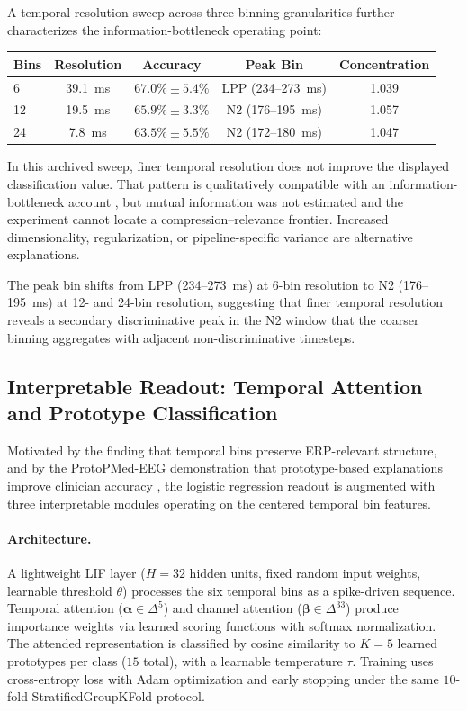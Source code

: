 A temporal resolution sweep across three binning granularities further characterizes the information-bottleneck operating point:
\begin{center}
\begin{tabular}{lcccc}
\toprule
\textbf{Bins} & \textbf{Resolution} & \textbf{Accuracy} & \textbf{Peak Bin} & \textbf{Concentration} \\
\midrule
6 & 39.1~ms & $67.0\% \pm 5.4\%$ & LPP (234--273~ms) & 1.039 \\
12 & 19.5~ms & $65.9\% \pm 3.3\%$ & N2 (176--195~ms) & 1.057 \\
24 & 7.8~ms & $63.5\% \pm 5.5\%$ & N2 (172--180~ms) & 1.047 \\
\bottomrule
\end{tabular}
\end{center}
In this archived sweep, finer temporal resolution does not improve the displayed classification value. That pattern is qualitatively compatible with an information-bottleneck account \cite{tishby_deep_2015}, but mutual information was not estimated and the experiment cannot locate a compression--relevance frontier. Increased dimensionality, regularization, or pipeline-specific variance are alternative explanations.

The peak bin shifts from LPP (234--273~ms) at 6-bin resolution to N2 (176--195~ms) at 12- and 24-bin resolution, suggesting that finer temporal resolution reveals a secondary discriminative peak in the N2 window that the coarser binning aggregates with adjacent non-discriminative timesteps.

\subsection{Interpretable Readout: Temporal Attention and Prototype Classification}
\label{sec:interpretable_readout}

Motivated by the finding that temporal bins preserve ERP-relevant structure, and by the ProtoPMed-EEG demonstration that prototype-based explanations improve clinician accuracy \cite{barnett_protopmed_2024}, the logistic regression readout is augmented with three interpretable modules operating on the centered temporal bin features.

\paragraph{Architecture.} A lightweight LIF layer ($H = 32$ hidden units, fixed random input weights, learnable threshold $\theta$) processes the six temporal bins as a spike-driven sequence. Temporal attention ($\boldsymbol{\alpha} \in \Delta^5$) and channel attention ($\boldsymbol{\beta} \in \Delta^{33}$) produce importance weights via learned scoring functions with softmax normalization. The attended representation is classified by cosine similarity to $K = 5$ learned prototypes per class ($15$ total), with a learnable temperature $\tau$. Training uses cross-entropy loss with Adam optimization and early stopping under the same $10$-fold StratifiedGroupKFold protocol.

